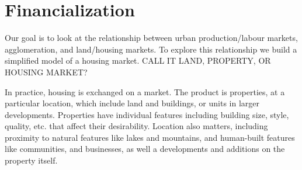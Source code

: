 


\section{Financialization}
Our goal is to look at the relationship between urban production/labour markets, agglomeration, and land/housing markets. To explore this relationship we build a simplified model of a \gls{housing market}. CALL IT LAND, PROPERTY, OR HOUSING MARKET? %

In practice, housing is exchanged on a market. The product is properties, at a particular location, which include land and buildings, or units in larger developments. Properties have individual features including building size, style, quality, etc. that affect their desirability. %
Location also matters, %
including proximity to natural features like lakes and mountains, and human-built features like communities, and businesses, as well a developments and additions on the property itself. 

